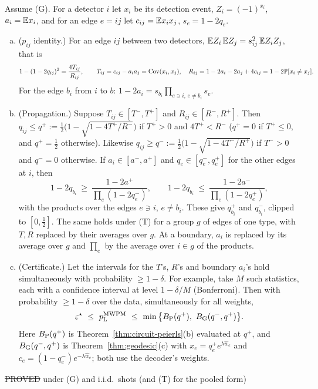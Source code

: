 \begin{proposition}\label{prop:data-cert}
Assume (G). For a detector $i$ let $x_i$ be its detection event, $Z_i=(-1)^{x_i}$, $a_i=\mathbb{E} x_i$, and for an edge $e=ij$ let $c_{ij}=\mathbb{E} x_ix_j$, $s_e=1-2q_e$.
\begin{enumerate}[(a)]
\item ($p_{ij}$ identity.) For an edge $ij$ between two detectors, $\mathbb{E} Z_i\,\mathbb{E} Z_j=s_{ij}^2\,\mathbb{E} Z_iZ_j$, that is
\[
1-(1-2q_{ij})^2=\frac{4T_{ij}}{R_{ij}},\qquad T_{ij}=c_{ij}-a_ia_j=\mathrm{Cov}(x_i,x_j),\quad R_{ij}=1-2a_i-2a_j+4c_{ij}=1-2\mathbb{P}[x_i\ne x_j].
\]
For the edge $b_i$ from $i$ to $b$: $1-2a_i=s_{b_i}\prod_{e\ni i,\,e\ne b_i}s_e$.
\item (Propagation.) Suppose $T_{ij}\in[T^-,T^+]$ and $R_{ij}\in[R^-,R^+]$. Then $q_{ij}\le q^+:=\tfrac12\big(1-\sqrt{1-4T^+/R^-}\big)$ if $T^+>0$ and $4T^+<R^-$ ($q^+=0$ if $T^+\le0$, and $q^+=\tfrac12$ otherwise). Likewise $q_{ij}\ge q^-:=\tfrac12\big(1-\sqrt{1-4T^-/R^+}\big)$ if $T^->0$ and $q^-=0$ otherwise. If $a_i\in[a^-,a^+]$ and $q_e\in[q_e^-,q_e^+]$ for the other edges at $i$, then
\[
1-2q_{b_i}\ \ge\ \frac{1-2a^+}{\prod_{e}(1-2q_e^-)},\qquad 1-2q_{b_i}\ \le\ \frac{1-2a^-}{\prod_{e}(1-2q_e^+)},
\]
with the products over the edges $e\ni i$, $e\ne b_i$. These give $q_{b_i}^+$ and $q_{b_i}^-$, clipped to $[0,\tfrac12]$.
The same holds under (T) for a group $g$ of edges of one type, with $T,R$ replaced by their averages over $g$. At a boundary, $a_i$ is replaced by its average over $g$ and $\prod_e$ by the average over $i\in g$ of the products.
\item (Certificate.) Let the intervals for the $T$'s, $R$'s and boundary $a_i$'s hold simultaneously with probability $\ge1-\delta$. For example, take $M$ such statistics, each with a confidence interval at level $1-\delta/M$ (Bonferroni). Then with probability $\ge1-\delta$ over the data, simultaneously for all weights,
\[
\varepsilon^{\star}\ \le\ p_{\mathrm{L}}^{\rm MWPM}\ \le\ \min\big\{B_{\rm P}(q^+),\ B_{\rm G}(q^-,q^+)\big\}.
\]
Here $B_{\rm P}(q^+)$ is Theorem~\ref{thm:circuit-peierls}(b) evaluated at $q^+$, and $B_{\rm G}(q^-,q^+)$ is Theorem~\ref{thm:geodesic}(c) with $x_e=q_e^+e^{\lambda\hat w_e}$ and $c_e=(1-q_e^-)e^{-\lambda\hat w_e}$; both use the decoder's weights.
\end{enumerate}
\hfill\st{PROVED} under (G) and i.i.d.\ shots (and (T) for the pooled form)
\end{proposition}

